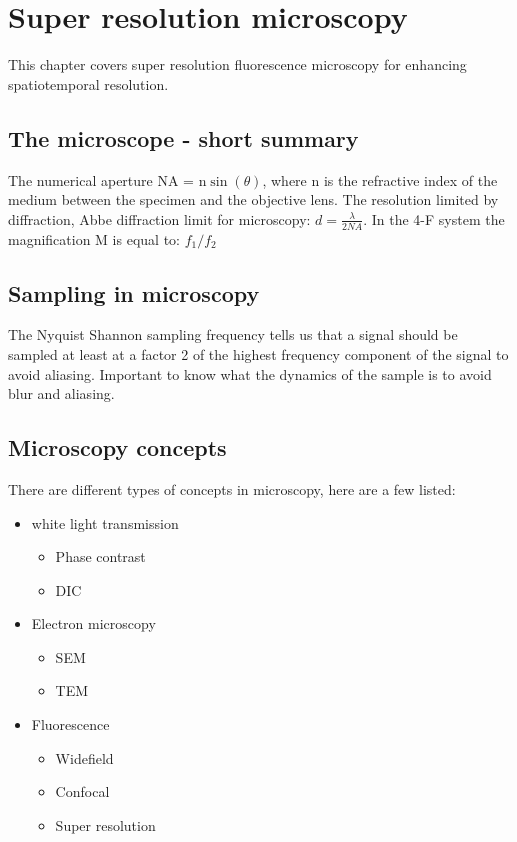 \section{Super resolution microscopy}
This chapter covers super resolution fluorescence microscopy for enhancing spatiotemporal resolution.

	\subsection*{The microscope - short summary}
	The numerical aperture NA = n$\sin(\theta)$, where n is the refractive index of the medium between the specimen and the objective lens. The resolution limited by diffraction, Abbe diffraction limit for microscopy: $d = \frac{\lambda} {2NA}$. In the 4-F system the magnification M is equal to: $f_1 / f_2$

	\subsection*{Sampling in microscopy}
	The Nyquist Shannon sampling frequency tells us that a signal should be sampled at least at a factor 2 of the highest frequency component of the signal to avoid aliasing. Important to know what the dynamics of the sample is to avoid blur and aliasing. 

	\subsection*{Microscopy concepts}
	There are different types of concepts in microscopy, here are a few listed:

	\begin{itemize}
		\item white light transmission
		\begin{itemize}
			\item Phase contrast
			\item DIC
		\end{itemize}
		\item Electron microscopy
		\begin{itemize}
			\item SEM
			\item TEM
		\end{itemize}
		\item Fluorescence 
		\begin{itemize}
			\item Widefield
			\item Confocal
			\item Super resolution
		\end{itemize}
	\end{itemize}


